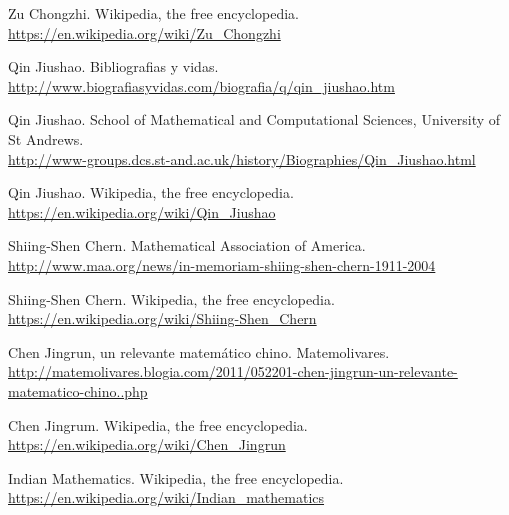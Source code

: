 \begin{thebibliography}{10}
Zu Chongzhi. Wikipedia, the free encyclopedia.\\
  \url{https://en.wikipedia.org/wiki/Zu_Chongzhi}
  
Qin Jiushao. Bibliografias y vidas.\\
  \url{http://www.biografiasyvidas.com/biografia/q/qin_jiushao.htm}

Qin Jiushao. School of Mathematical and Computational Sciences, University of St Andrews.\\
  \url{http://www-groups.dcs.st-and.ac.uk/history/Biographies/Qin_Jiushao.html}

Qin Jiushao. Wikipedia, the free encyclopedia.\\
  \url{https://en.wikipedia.org/wiki/Qin_Jiushao}

Shiing-Shen Chern. Mathematical Association of America.\\
  \url{http://www.maa.org/news/in-memoriam-shiing-shen-chern-1911-2004}

Shiing-Shen Chern. Wikipedia, the free encyclopedia.\\
  \url{https://en.wikipedia.org/wiki/Shiing-Shen_Chern}

Chen Jingrun, un relevante matemático chino. Matemolivares.\\
  \url{http://matemolivares.blogia.com/2011/052201-chen-jingrun-un-relevante-matematico-chino..php}

Chen Jingrum. Wikipedia, the free encyclopedia.\\
  \url{https://en.wikipedia.org/wiki/Chen_Jingrun}

Indian Mathematics. Wikipedia, the free encyclopedia.\\
  \url{https://en.wikipedia.org/wiki/Indian_mathematics}
\end{thebibliography}
